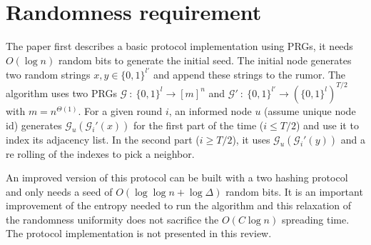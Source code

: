 \documentclass[10pt,journal,a4paper]{IEEEtran}
\begin{document}
\section{Randomness requirement}

The paper first describes a basic protocol implementation using PRGs, it  needs $O(\log n)$ random bits to generate the initial seed. The initial node generates two random strings $x,y \in \{0,1\}^{l'}$ and append these strings to the rumor. The algorithm uses two PRGs $\mathcal G~:~\{0,1\}^l \to [m]^n$ and $\mathcal G'~:~\{0,1\}^{l'} \to (\{0,1\}^l)^{T/2}$ with $m=n^{\Theta(1)}$. For a given round $i$, an informed node $u$ (assume unique node id) generates $\mathcal G_u(\mathcal G _i' (x))$ for the first part of the time ($i \leq T/2$) and use it to index its adjacency list. In the second part ($i \geq T/2$), it uses $\mathcal G_u(\mathcal G _i' (y))$ and a re rolling of the indexes to pick a neighbor.

An improved version of this protocol can be built with a two hashing protocol and only needs a seed of $O(\log \log n + \log \Delta)$ random bits. It is an important improvement of the entropy needed to run the algorithm and this relaxation of the randomness uniformity does not sacrifice the $O(C\log n)$ spreading time. The protocol implementation is not presented in this review.

\end{document}

